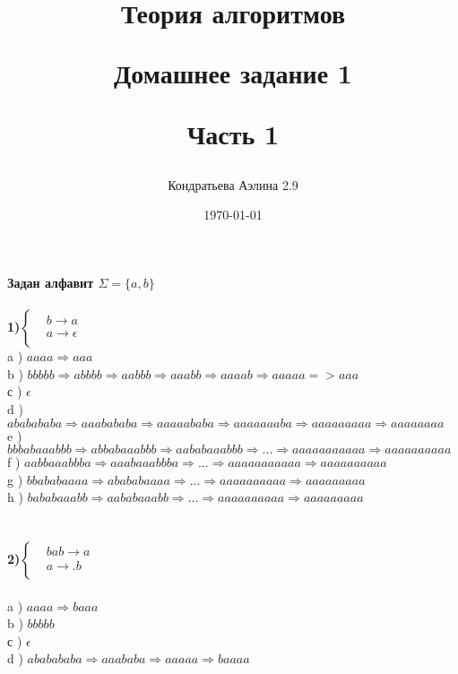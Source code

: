 \documentclass[a4paper,14pt]{article}
\title{Теория алгоритмов

Домашнее задание 1

Часть 1}
\author{Кондратьева Аэлина 2.9}
\date{\today}
\begin{document}
\maketitle

\newpage


\textbf{Задан алфавит $\Sigma = \{a,b\}$}\\\\
\textbf{1)}$ \left\{
\begin{aligned}
&b \rightarrow a \\
&a \rightarrow \epsilon \\
\end{aligned}
\right.$
\\
a ) $aaaa\Rightarrow aaa$\\
b ) $bbbbb\Rightarrow abbbb\Rightarrow aabbb\Rightarrow aaabb\Rightarrow aaaab\Rightarrow aaaaa => aaa$\\
с ) $\epsilon$\\
d ) $ababababa\Rightarrow aaabababa\Rightarrow aaaaababa\Rightarrow aaaaaaaba\Rightarrow aaaaaaaaa\Rightarrow aaaaaaaa$\\
e ) $bbbabaaabbb\Rightarrow abbabaaabbb\Rightarrow aababaaabbb\Rightarrow ...\Rightarrow aaaaaaaaaaa\Rightarrow aaaaaaaaaa$\\
f ) $aabbaaabbba\Rightarrow aaabaaabbba\Rightarrow ...\Rightarrow aaaaaaaaaaa\Rightarrow aaaaaaaaaa$\\
g ) $bbababaaaa\Rightarrow abababaaaa\Rightarrow ...\Rightarrow aaaaaaaaaa\Rightarrow aaaaaaaaa$\\
h ) $bababaaabb\Rightarrow aababaaabb\Rightarrow ...\Rightarrow aaaaaaaaaa\Rightarrow aaaaaaaaa$\\
\\\\
\textbf{2)}$ \left\{
\begin{aligned}
&bab \rightarrow a \\
&a \rightarrow .b \\
\end{aligned}
\right.$
\\\\
a ) $aaaa\Rightarrow baaa$\\
b ) $bbbbb$\\
с ) $\epsilon$\\
d ) $ababababa\Rightarrow aaababa\Rightarrow aaaaa\Rightarrow baaaa$\\
\end{document}
